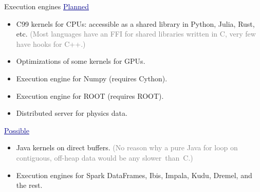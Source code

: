 \documentclass{beamer}
\begin{document}
\begin{frame}{Execution engines}
\vspace{0.5 cm}
\textcolor{darkblue}{\underline{Planned}}

\begin{itemize}
\item C99 kernels for CPUs: accessible as a shared library in Python, Julia, Rust, etc. \textcolor{gray}{(Most languages have an FFI for shared libraries written in C, very few have hooks for C++.)}
\item Optimizations of some kernels for GPUs.
\item Execution engine for Numpy (requires Cython).
\item Execution engine for ROOT (requires ROOT).
\item Distributed server for physics data.
\end{itemize}

\vspace{0.25 cm}
\textcolor{darkblue}{\underline{Possible}}

\begin{itemize}
\item Java kernels on direct buffers. \textcolor{gray}{(No reason why a pure Java for loop on contiguous, off-heap data would be any \mbox{slower than C.)\hspace{-1 cm}}}
\item Execution engines for Spark DataFrames, Ibis, Impala, Kudu, Dremel, and the rest.
\end{itemize}
\end{frame}
\end{document}
